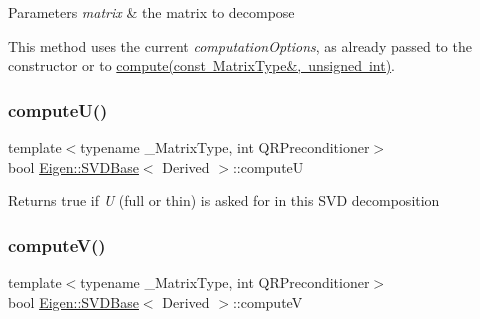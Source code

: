\begin{DoxyParams}{Parameters}
{\em matrix} & the matrix to decompose\\
\hline
\end{DoxyParams}
This method uses the current {\itshape computation\+Options}, as already passed to the constructor or to \mbox{\hyperlink{class_eigen_1_1_jacobi_s_v_d_a5dab376cc86cf0d36674bcdad4af3f5a}{compute(const Matrix\+Type\&, unsigned int)}}. \mbox{\label{class_eigen_1_1_jacobi_s_v_d_a705a7c2709e1624ccc19aa748a78d473}} 
\subsubsection{\texorpdfstring{computeU()}{computeU()}}
{\footnotesize\ttfamily template$<$typename \+\_\+\+Matrix\+Type, int Q\+R\+Preconditioner$>$ \\
bool \mbox{\hyperlink{class_eigen_1_1_s_v_d_base}{Eigen\+::\+S\+V\+D\+Base}}$<$ Derived $>$\+::computeU\hspace{0.3cm}{\ttfamily [inline]}}

\begin{DoxyReturn}{Returns}
true if {\itshape U} (full or thin) is asked for in this S\+VD decomposition 
\end{DoxyReturn}
\mbox{\label{class_eigen_1_1_jacobi_s_v_d_a5f12efcb791eb007d4a4890ac5255ac4}} 
\subsubsection{\texorpdfstring{computeV()}{computeV()}}
{\footnotesize\ttfamily template$<$typename \+\_\+\+Matrix\+Type, int Q\+R\+Preconditioner$>$ \\
bool \mbox{\hyperlink{class_eigen_1_1_s_v_d_base}{Eigen\+::\+S\+V\+D\+Base}}$<$ Derived $>$\+::computeV\hspace{0.3cm}{\ttfamily [inline]}}

